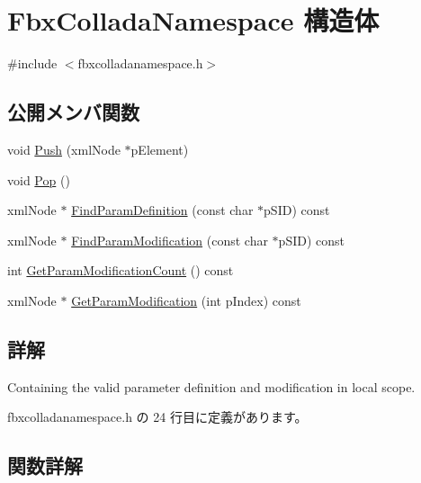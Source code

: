 \hypertarget{struct_fbx_collada_namespace}{}\section{Fbx\+Collada\+Namespace 構造体}
\label{struct_fbx_collada_namespace}


{\ttfamily \#include $<$fbxcolladanamespace.\+h$>$}

\subsection*{公開メンバ関数}
\begin{DoxyCompactItemize}
\item 
void \hyperlink{struct_fbx_collada_namespace_a844aeced65709b23349ed14e444c862b}{Push} (xml\+Node $\ast$p\+Element)
\item 
void \hyperlink{struct_fbx_collada_namespace_ae1748532010af20d42578135ba8fab6e}{Pop} ()
\item 
xml\+Node $\ast$ \hyperlink{struct_fbx_collada_namespace_a63ad15d7dec6e1a8095427f04dce860f}{Find\+Param\+Definition} (const char $\ast$p\+S\+ID) const
\item 
xml\+Node $\ast$ \hyperlink{struct_fbx_collada_namespace_a6061a9a88eecad58d7909ac84d7c0e73}{Find\+Param\+Modification} (const char $\ast$p\+S\+ID) const
\item 
int \hyperlink{struct_fbx_collada_namespace_a0f8447e3228c77bca4f9a1ad2f759e1d}{Get\+Param\+Modification\+Count} () const
\item 
xml\+Node $\ast$ \hyperlink{struct_fbx_collada_namespace_a5bf3b2e91505df6ef9621e79349a14d7}{Get\+Param\+Modification} (int p\+Index) const
\end{DoxyCompactItemize}


\subsection{詳解}
Containing the valid parameter definition and modification in local scope. 

 fbxcolladanamespace.\+h の 24 行目に定義があります。



\subsection{関数詳解}
\mbox{\label{struct_fbx_collada_namespace_a63ad15d7dec6e1a8095427f04dce860f}} 
